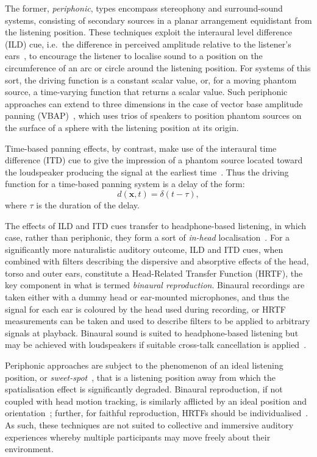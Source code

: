 The former, \textit{periphonic}, types encompass stereophony and surround-sound
systems, consisting of secondary sources in a planar arrangement equidistant
from the listening position.
These techniques exploit the interaural level difference (ILD) cue, i.e.\ the
difference in perceived amplitude relative to the listener's
ears~\citep{pulkki_virtual_1997,verheijen_sound_1998,ziemer_wave_2020}, to
encourage the listener to localise sound to a position on the circumference of
an arc or circle around the listening position.
For systems of this sort, the driving function is a constant scalar value, or,
for a moving phantom source, a time-varying function that returns a scalar
value.
Such periphonic approaches can extend to three dimensions in the case of
vector base amplitude panning (VBAP)~\citep{pulkki_virtual_1997}, which uses
trios of speakers to position phantom sources on the surface of a sphere
with the listening position at its origin.

Time-based panning effects, by contrast, make use of the interaural time
difference (ITD) cue to give the impression of a phantom source located toward
the loudspeaker producing the signal at the earliest
time~\citep{pulkki_virtual_1997,verheijen_sound_1998}.
Thus the driving function for a time-based panning system is a delay of the
form:
\begin{equation}
    d(\mathbf{x},t) = \delta(t - \tau),
    \label{eq:time-driving-function}
\end{equation}
where $\tau$ is the duration of the delay.

The effects of ILD and ITD cues transfer to headphone-based listening, in which
case, rather than periphonic, they form a sort of \textit{in-head}
localisation~\citep{ahrens_analytic_2012}.
For a significantly more naturalistic auditory outcome, ILD and ITD cues, when
combined with filters describing the dispersive and absorptive effects of the
head, torso and outer ears, constitute a Head-Related Transfer Function (HRTF),
the key component in what is termed \textit{binaural reproduction}.
Binaural recordings are taken either with a dummy head or ear-mounted
microphones, and thus the signal for each ear is coloured by the head used
during recording, or HRTF measurements can be taken and used to describe filters
to be applied to arbitrary signals at playback.
Binaural sound is suited to headphone-based listening but may be achieved with
loudspeakers if suitable cross-talk cancellation is
applied~\citep{kaiser_transaural_2011}.

Periphonic approaches are subject to the phenomenon of an ideal listening
position, or \textit{sweet-spot}~\citep{nicol_sound_2017}, that is a listening
position away from which the spatialisation effect is significantly degraded.
Binaural reproduction, if not coupled with head motion tracking, is similarly
afflicted by an ideal position and orientation~\citep{verheijen_sound_1998};
further, for faithful reproduction, HRTFs should be
individualised~\citep{de_poli_physically_1998}.
As such, these techniques are not suited to collective and immersive auditory
experiences whereby multiple participants may move freely about their
environment.

